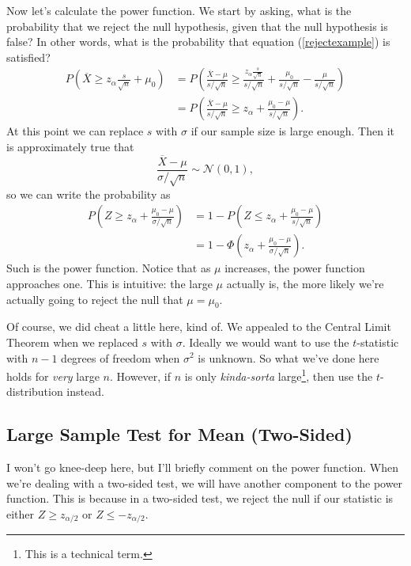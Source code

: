 \documentclass[12pt]{article}
\newcommand{\xbar}{\overline{X}}
\newcommand{\normal}[2]{\mathcal{N} \left({#1}, {#2} \right)}
\theoremstyle{definition}
\begin{document}
Now let's calculate the power function. We start by asking, what is the probability that we reject the null hypothesis, given that the null hypothesis is false? In other words, what is the probability that equation (\ref{rejectexample}) is satisfied?
\begin{align*}
	P\left( \xbar   \geq z_{\alpha}\frac{s}{\sqrt{n}}+\mu_0 \right) 
		& =	P\left( \frac{\xbar -\mu}{s / \sqrt{n}}  \geq \frac{z_{\alpha}\frac{s}{\sqrt{n}}}{s / \sqrt{n}}+\frac{\mu_0}{s / \sqrt{n}} - \frac{\mu}{s / \sqrt{n}} \right) \\
		& =	P\left( \frac{\xbar -\mu}{s / \sqrt{n}}  \geq z_{\alpha}+\frac{\mu_0 - \mu}{s / \sqrt{n}} \right). 
\end{align*}
At this point we can replace $s$ with $\sigma$ if our sample size is large enough. Then it is approximately true that
	\[ \frac{\xbar -\mu}{\sigma / \sqrt{n}}  \sim \normal{0}{1},\]
so we can write the probability as 
\begin{align*}
	P\left( Z \geq z_{\alpha}+\frac{\mu_0 - \mu}{\sigma / \sqrt{n}} \right)
		&= 1-	P\left( Z \leq z_{\alpha}+\frac{\mu_0 - \mu}{s / \sqrt{n}} \right) \\
		&= 1 - \Phi\left(  z_{\alpha}+\frac{\mu_0 - \mu}{\sigma / \sqrt{n}}\right).
\end{align*}	
Such is the power function. Notice that as $\mu$ increases, the power function approaches one. This is intuitive: the large $\mu$ actually is, the more likely we're actually going to reject the null that $\mu=\mu_0$. 

Of course, we did cheat a little here, kind of. We appealed to the Central Limit Theorem when we replaced $s$ with $\sigma$. Ideally we would want to use the $t$-statistic with $n-1$ degrees of freedom when $\sigma^2$ is unknown. So what we've done here holds for \emph{very} large $n$. However, if $n$ is only \emph{kinda-sorta} large\footnote{This is a technical term.}, then use the $t$-distribution instead. 


\subsection{Large Sample Test for Mean (Two-Sided)}
I won't go knee-deep here, but I'll briefly comment on the power function. When we're dealing with a two-sided test, we will have another component to the power function. This is because in a two-sided test, we reject the null if our statistic is either $Z \geq z_{\alpha/2}$ or  $Z \leq -z_{\alpha/2}$. 
\end{document}

